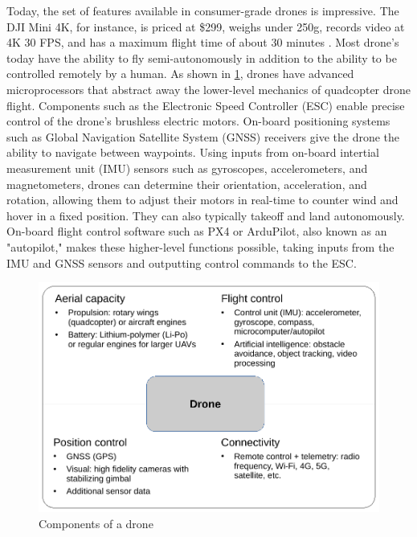 Today, the set of features available in consumer-grade drones is impressive.
The DJI Mini 4K, for instance, is priced at \$299, weighs under 250g, records
video at 4K 30 FPS, and has a maximum flight time of about 30 minutes
\cite{dji_mini_4k}. Most drone's today have the ability to fly
semi-autonomously in addition to the ability to be controlled remotely by a
human. As shown in \cref{fig:drone-components}, drones have advanced
microprocessors that abstract away the lower-level mechanics of quadcopter
drone flight. Components such as the Electronic Speed Controller (ESC) enable
precise control of the drone's brushless electric motors. On-board positioning
systems such as Global Navigation Satellite System (GNSS) receivers give the
drone the ability to navigate between waypoints.  Using inputs from on-board
intertial measurement unit (IMU) sensors such as gyroscopes, accelerometers,
and magnetometers, drones can determine their orientation, acceleration, and
rotation, allowing them to adjust their motors in real-time to counter wind and
hover in a fixed position. They can also typically takeoff and land
autonomously. On-board flight control software such as PX4 or ArduPilot, also
known as an "autopilot," makes these higher-level functions possible, taking
inputs from the IMU and GNSS sensors and outputting control commands to the
ESC.

\begin{figure}[htbp]
\centerline{\includegraphics[width = .6\textwidth]{figs/drone-components-crop.pdf}}
\caption{Components of a drone \cite{giones2017}}
\label{fig:drone-components}
\end{figure}

